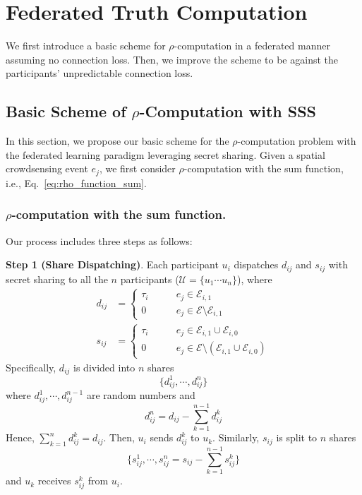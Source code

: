 \documentclass[11pt]{article}
\begin{document}
\section{Federated Truth Computation}
\label{sec:truth_computation}

We first introduce a basic scheme for $\rho$-computation in a federated manner assuming no connection loss. Then, we improve the scheme to be against the participants' unpredictable connection loss. %

\subsection{Basic Scheme of $\rho$-Computation with SSS}
\label{sub:basic_rho_computation}

In this section, we propose our basic scheme for the $\rho$-computation problem with the federated learning paradigm leveraging secret sharing. Given a spatial crowdsensing event $e_j$, we first consider $\rho$-computation with the sum function, i.e., Eq.~\ref{eq:rho_function_sum}.

\subsubsection{$\rho$-computation with the sum function.} Our process includes three steps as follows:


\textbf{Step 1 (Share Dispatching)}. Each participant $u_i$ dispatches $d_{ij}$ and $s_{ij}$ with secret sharing to all the $n$ participants ($\mathcal U = \{u_1\cdots u_n\}$), where
\begin{align}
	d_{ij} & =
	\begin{cases}
		\tau_i & \quad\quad e_j \in \mathcal E_{i,1} \\
		0 & \quad\quad e_j \in \mathcal E\setminus \mathcal E_{i,1}
	\end{cases}\\
	s_{ij} &=
	\begin{cases}
		\tau_i & \quad\quad e_j \in \mathcal E_{i,1}\cup \mathcal E_{i,0} \\
		0 & \quad\quad e_j \in \mathcal E\setminus(\mathcal E_{i,1}\cup \mathcal E_{i,0})
	\end{cases}
\end{align}
Specifically, $d_{ij}$ is divided into $n$ shares
$$\{d_{ij}^1,\cdots,d_{ij}^n\}$$
where $d_{ij}^1, \cdots, d_{ij}^{n-1}$ are random numbers and
$$d_{ij}^n = d_{ij} - \sum_{k=1}^{n-1} d_{ij}^k$$
Hence,
$\sum_{k=1}^n d_{ij}^k = d_{ij}$.
Then, $u_i$ sends $d_{ij}^k$ to $u_k$. Similarly, $s_{ij}$ is split to $n$ shares
$$\{s_{ij}^1,\cdots,s_{ij}^n=s_{ij}-\sum_{k=1}^{n-1} s_{ij}^k\}$$
and $u_k$ receives $s_{ij}^k$ from $u_i$.
\end{document}
